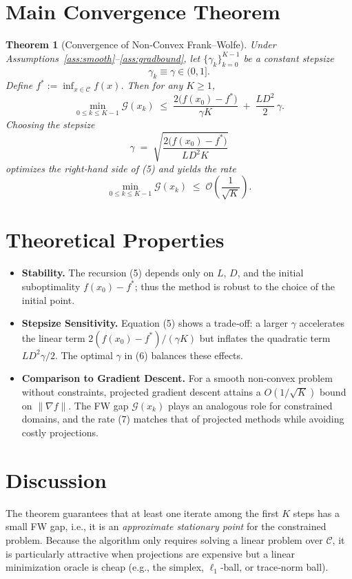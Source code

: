 \documentclass{article}
\newtheorem{theorem}{Theorem}
\newcommand{\gap}{\mathcal{G}}
\begin{document}
\section*{Main Convergence Theorem}
\begin{theorem}[Convergence of Non‑Convex Frank–Wolfe]\label{thm:main}
Under Assumptions~\ref{ass:smooth}–\ref{ass:gradbound}, let $\{\gamma_{k}\}_{k=0}^{K-1}$ be a constant stepsize
\[
\gamma_{k}\equiv \gamma\in(0,1].
\]
Define $f^{*}:=\inf_{x\in\mathcal{C}}f(x)$. Then for any $K\ge1$,
\[
\min_{0\le k\le K-1}\gap(x_{k})
\;\le\;
\frac{2\bigl(f(x_{0})-f^{*}\bigr)}{\gamma K}
\;+\;
\frac{L D^{2}}{2}\,\gamma .
\tag{5}
\]
Choosing the stepsize
\[
\gamma\;=\;\sqrt{\frac{2\bigl(f(x_{0})-f^{*}\bigr)}{L D^{2}K}}
\tag{6}
\]
optimizes the right‑hand side of (5) and yields the rate
\[
\min_{0\le k\le K-1}\gap(x_{k})
\;\le\;
\mathcal{O}\!\left(\frac{1}{\sqrt{K}}\right).
\tag{7}
\]
\end{theorem}

\section*{Theoretical Properties}
\begin{itemize}
    \item \textbf{Stability.} The recursion (5) depends only on $L$, $D$, and the initial suboptimality $f(x_{0})-f^{*}$; thus the method is robust to the choice of the initial point.
    \item \textbf{Stepsize Sensitivity.} Equation (5) shows a trade‑off: a larger $\gamma$ accelerates the linear term $2(f(x_{0})-f^{*})/(\gamma K)$ but inflates the quadratic term $LD^{2}\gamma/2$. The optimal $\gamma$ in (6) balances these effects.
    \item \textbf{Comparison to Gradient Descent.} For a smooth non‑convex problem without constraints, projected gradient descent attains a $O(1/\sqrt{K})$ bound on $\|\nabla f\|$. The FW gap $\gap(x_{k})$ plays an analogous role for constrained domains, and the rate (7) matches that of projected methods while avoiding costly projections.
\end{itemize}

\section*{Discussion}
The theorem guarantees that at least one iterate among the first $K$ steps has a small FW gap, i.e., it is an \emph{approximate stationary point} for the constrained problem. Because the algorithm only requires solving a linear problem over $\mathcal{C}$, it is particularly attractive when projections are expensive but a linear minimization oracle is cheap (e.g., the simplex, $\ell_{1}$-ball, or trace‑norm ball).
\end{document}
